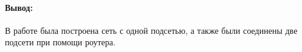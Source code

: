 \paragraph{Вывод:}
В работе была построена сеть с одной подсетью, а также были соединены две подсети при помощи роутера.